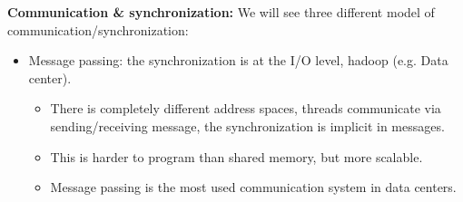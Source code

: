     \begin{tcolorbox}[gris]
        \textbf{Communication \& synchronization:}
        We will see three different model of communication/synchronization:
        \begin{itemize}[left=10pt, label=\textbullet]
            \item Message passing: the synchronization is at the I/O level, hadoop (e.g. Data center).
                \begin{itemize}[left=10pt]
                    \item There is completely different address spaces, threads communicate via sending/receiving message, the synchronization is implicit in messages. 
                    \item This is harder to program than shared memory, but more scalable.
                    \item Message passing is the most used communication system in data centers.
                \end{itemize}
                

\end{itemize}
\end{tcolorbox}
